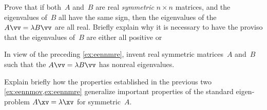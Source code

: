 \begin{exercise} \label{ex:eennmre} 
Prove that if both~\(A\) and~\(B\) are real \emph{symmetric} \(n\times n\) matrices, and the eigenvalues of~\(B\) all have the same sign, then the eigenvalues of the  \(A\vv=\lambda B\vv\) are all real.
Briefly explain why it is necessary to have the proviso that the eigenvalues of~\(B\) are either all positive or 
\end{exercise}


\begin{exercise}  
In view of the preceding \cref{ex:eennmre},
invent real symmetric matrices~\(A\) and~\(B\) such that the  \(A\vv=\lambda B\vv\) has nonreal  eigenvalues.
\end{exercise}



\begin{exercise}  
Explain briefly how the properties established in the previous two 
\cref{ex:eennmov,ex:eennmre} generalize important properties of the standard eigen-problem \(A\xv=\lambda\xv\) for symmetric~\(A\).
\end{exercise}






